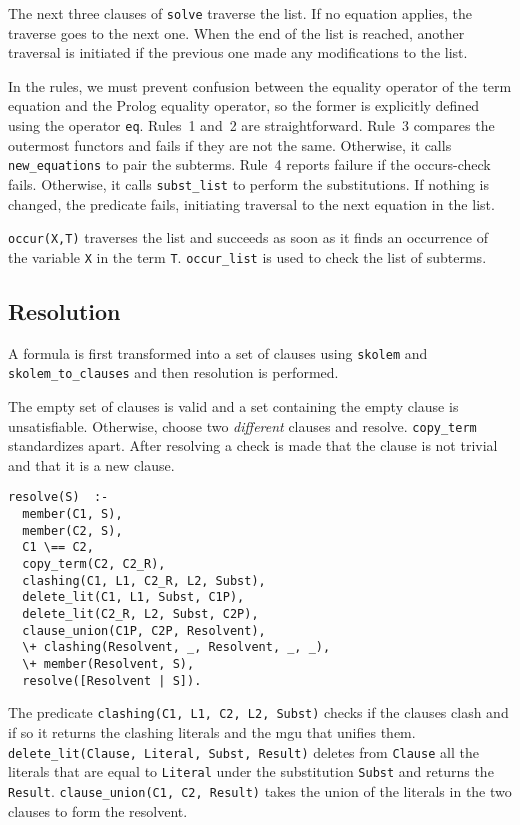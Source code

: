 \documentclass[11pt]{article}
\newcommand*{\p}[1]{\textup{\texttt{#1}}}
\begin{document}
The next three clauses of \p{solve} traverse the list. If no equation
applies, the traverse goes to the next one. When the end of the list is
reached, another traversal is initiated if the previous one made any
modifications to the list.

In the rules, we must prevent confusion between the equality operator of
the term equation and the Prolog equality operator, so the former is
explicitly defined using the operator \p{eq}. Rules~1 and~2 are
straightforward. Rule~3 compares the outermost functors and fails if
they are not the same. Otherwise, it calls \p{new\_equations} to pair
the subterms. Rule~4 reports failure if the occurs-check fails.
Otherwise, it calls \p{subst\_list} to perform the substitutions. If
nothing is changed, the predicate fails, initiating traversal to the
next equation in the list.

\p{occur(X,T)} traverses the list and succeeds as soon as it finds an
occurrence of the variable \p{X} in the term \p{T}. \p{occur\_list} is
used to check the list of subterms.




\subsection{Resolution}\label{s.resfol}

A formula is first transformed into a set of clauses using \p{skolem}
and \p{skolem\_to\_clauses} and then resolution is performed.

The empty set of clauses is valid and a set containing the empty clause
is unsatisfiable. Otherwise, choose two \emph{different} clauses and
resolve. \p{copy\_term} standardizes apart. After resolving a check is
made that the clause is not trivial and that it is a new clause.
\begin{verbatim}
resolve(S)  :-
  member(C1, S),
  member(C2, S),
  C1 \== C2,
  copy_term(C2, C2_R),
  clashing(C1, L1, C2_R, L2, Subst),
  delete_lit(C1, L1, Subst, C1P),
  delete_lit(C2_R, L2, Subst, C2P),
  clause_union(C1P, C2P, Resolvent),
  \+ clashing(Resolvent, _, Resolvent, _, _),
  \+ member(Resolvent, S),
  resolve([Resolvent | S]).
\end{verbatim}

The predicate \p{clashing(C1, L1, C2, L2, Subst)} checks if the clauses
clash and if so it returns the clashing literals and the mgu that
unifies them. \p{delete\_lit(Clause, Literal, Subst, Result)} deletes
from \p{Clause} all the literals that are equal to \p{Literal} under the
substitution \p{Subst} and returns the \p{Result}. \p{clause\_union(C1,
C2, Result)} takes the union of the literals in the two clauses to form
the resolvent.
\end{document}
